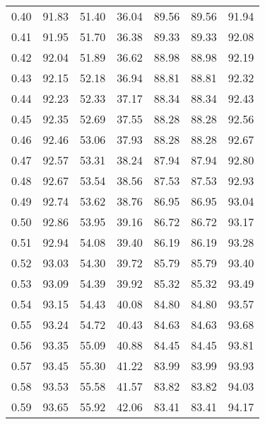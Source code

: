 \begin{tabular}{|c|c|c|c|c|c|c|}
      0.40 &     91.83 &     51.40 &      36.04 &   89.56 &      89.56 &         91.94 \\
      0.41 &     91.95 &     51.70 &      36.38 &   89.33 &      89.33 &         92.08 \\
      0.42 &     92.04 &     51.89 &      36.62 &   88.98 &      88.98 &         92.19 \\
      0.43 &     92.15 &     52.18 &      36.94 &   88.81 &      88.81 &         92.32 \\
      0.44 &     92.23 &     52.33 &      37.17 &   88.34 &      88.34 &         92.43 \\
      0.45 &     92.35 &     52.69 &      37.55 &   88.28 &      88.28 &         92.56 \\
      0.46 &     92.46 &     53.06 &      37.93 &   88.28 &      88.28 &         92.67 \\
      0.47 &     92.57 &     53.31 &      38.24 &   87.94 &      87.94 &         92.80 \\
      0.48 &     92.67 &     53.54 &      38.56 &   87.53 &      87.53 &         92.93 \\
      0.49 &     92.74 &     53.62 &      38.76 &   86.95 &      86.95 &         93.04 \\
      0.50 &     92.86 &     53.95 &      39.16 &   86.72 &      86.72 &         93.17 \\
      0.51 &     92.94 &     54.08 &      39.40 &   86.19 &      86.19 &         93.28 \\
      0.52 &     93.03 &     54.30 &      39.72 &   85.79 &      85.79 &         93.40 \\
      0.53 &     93.09 &     54.39 &      39.92 &   85.32 &      85.32 &         93.49 \\
      0.54 &     93.15 &     54.43 &      40.08 &   84.80 &      84.80 &         93.57 \\
      0.55 &     93.24 &     54.72 &      40.43 &   84.63 &      84.63 &         93.68 \\
      0.56 &     93.35 &     55.09 &      40.88 &   84.45 &      84.45 &         93.81 \\
      0.57 &     93.45 &     55.30 &      41.22 &   83.99 &      83.99 &         93.93 \\
      0.58 &     93.53 &     55.58 &      41.57 &   83.82 &      83.82 &         94.03 \\
      0.59 &     93.65 &     55.92 &      42.06 &   83.41 &      83.41 &         94.17 \\

\end{tabular}
